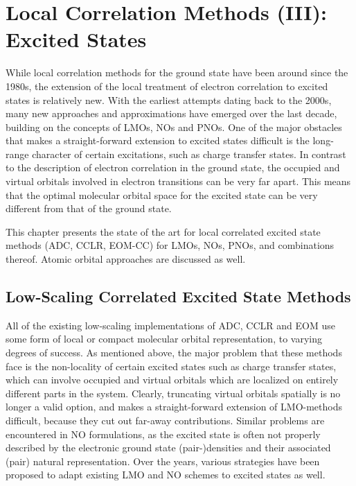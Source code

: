 \chapter{Local Correlation Methods (III): Excited States}

While local correlation methods for the ground state have been around since the 1980s, the extension of the local treatment of electron correlation to excited states is relatively new. With the earliest attempts dating back to the 2000s, many new approaches and approximations have emerged over the last decade, building on the concepts of LMOs, NOs and PNOs. One of the major obstacles that makes a straight-forward extension to excited states difficult is the long-range character of certain excitations, such as charge transfer states. In contrast to the description of electron correlation in the ground state, the occupied and virtual orbitals involved in electron transitions can be very far apart. This means that the optimal molecular orbital space for the excited state can be very different from that of the ground state. 

This chapter presents the state of the art for local correlated excited state methods (ADC, CCLR, EOM-CC) for LMOs, NOs, PNOs, and combinations thereof. Atomic orbital approaches are discussed as well. 



\section{Low-Scaling Correlated Excited State Methods}

All of the existing low-scaling implementations of ADC, CCLR and EOM use some form of local or compact molecular orbital representation, to varying degrees of success. As mentioned above, the major problem that these methods face is the non-locality of certain excited states such as charge transfer states, which can involve occupied and virtual orbitals which are localized on entirely different parts in the system. Clearly, truncating virtual orbitals spatially is no longer a valid option, and makes a straight-forward extension of LMO-methods difficult, because they cut out far-away contributions. Similar problems are encountered in NO formulations, as the excited state is often not properly described by the electronic ground state (pair-)densities and their associated (pair) natural representation. Over the years, various strategies have been proposed to adapt existing LMO and NO schemes to excited states as well. 

